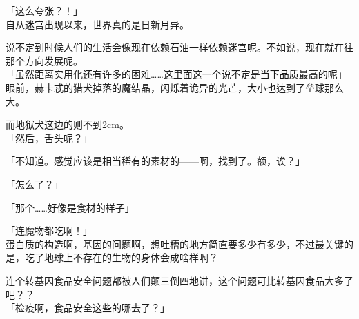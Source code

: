 「这么夸张？！」\\

自从迷宫出现以来，世界真的是日新月异。

说不定到时候人们的生活会像现在依赖石油一样依赖迷宫呢。不如说，现在就在往那个方向发展呢。\\

「虽然距离实用化还有许多的困难……这里面这一个说不定是当下品质最高的呢」\\

眼前，赫卡忒的猎犬掉落的魔结晶，闪烁着诡异的光芒，大小也达到了垒球那么大。

而地狱犬这边的则不到2cm。\\

「然后，舌头呢？」

「不知道。感觉应该是相当稀有的素材的——啊，找到了。额，诶？」

「怎么了？」

「那个……好像是食材的样子」

「连魔物都吃啊！」\\

蛋白质的构造啊，基因的问题啊，想吐槽的地方简直要多少有多少，不过最关键的是，吃了地球上不存在的生物的身体会成啥样啊？

连个转基因食品安全问题都被人们颠三倒四地讲，这个问题可比转基因食品大多了吧？？\\

「检疫啊，食品安全这些的哪去了？」

